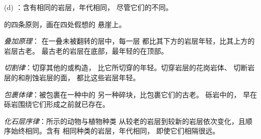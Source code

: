 \begin{omfigure}
\begin{minipage}[t]{0.49\linewidth}
{\small (d) ：含有相同的岩层，年代相同，
尽管它们的不同。}
\end{minipage}

\medskip
{\small {}的四条原则，画在四处假想的
悬崖上。}
\label{fig:g7:geological-time:principles}
\end{omfigure}

\begin{definition}[叠加原理]\label{def:g7:geological-time:superposition}
\emph{叠加原理}：
在一叠未被翻转的层中，每一层
都比其下方的岩层年轻，比其上方的岩层古老。
最古老的岩层在底部，最年轻的在顶部。
\end{definition}

\begin{definition}[切割律]\label{def:g7:geological-time:cross-cutting}
\emph{切割律}：切穿其他的或构造，
比它所切穿的年轻。切穿岩层的花岗岩体、
切断岩层的和削蚀岩层的面，
都比这些岩层年轻。
\end{definition}

\begin{definition}[包裹体律]\label{def:g7:geological-time:inclusion}
\emph{包裹体律}：被包裹在一种中的
另一种碎块，比包裹它们的古老。
砾岩中的，
早在砾岩围绕它们形成之前就已存在。
\end{definition}

\begin{definition}[化石层序律]\label{def:g7:geological-time:fossil-succession}
\emph{化石层序律}：所示的动物与植物种类
从较老的岩层到较新的岩层依次变化，且顺序始终相同。含有
相同种类的岩层，年代相同，
即使它们相隔很远。
\end{definition}


